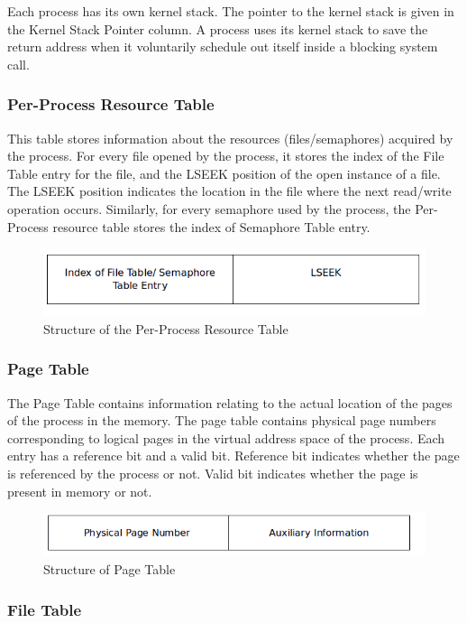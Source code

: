 \documentclass[11pt ,twosided]{article}
\begin{document}
Each process has its own kernel stack. The pointer to the kernel stack is given in the Kernel Stack Pointer column. A process uses its kernel stack to save the return address when it voluntarily schedule out itself inside a blocking system call. 
\subsubsection{Per-Process Resource Table}
This table stores information about the resources (files/semaphores) acquired by the process. For every file opened by the process, it stores the index of the File Table entry for the file, and the LSEEK position of the open instance of a file. The LSEEK position indicates the location in the file where the next read/write operation occurs. Similarly, for every semaphore used by the process, the Per-Process resource table stores the index of Semaphore Table entry. 
\begin{figure}[ht]
\centering
\includegraphics[scale=0.60]{PerProcessResource_table.png}
\caption{\footnotesize Structure of the Per-Process Resource Table}
\label{fig_3}
\end{figure}

\subsubsection{Page Table}
The Page Table contains information relating to the actual location of the pages of the process in the memory. The page table contains physical page numbers corresponding to logical pages in the virtual address space of the process. Each entry has a reference bit and a valid bit. Reference bit indicates whether the page is referenced by the process or not. Valid bit indicates whether the page is present in memory or not.
\begin{figure}[ht]
\centering
\includegraphics[scale=0.60]{Page_table.png}
\caption{\footnotesize Structure of Page Table}
\label{fig_4}
\end{figure}
\subsubsection{File Table}
\end{document}
